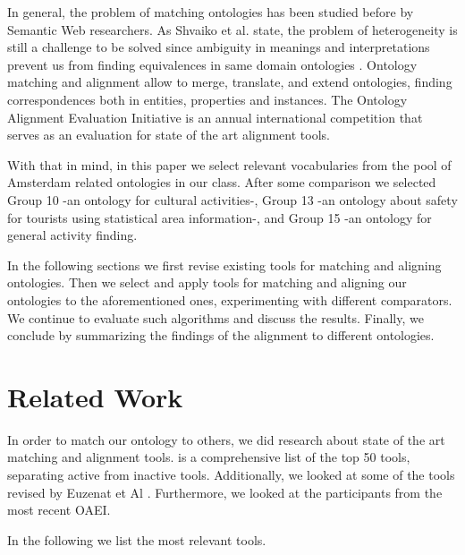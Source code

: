 \documentclass[runningheads,a4paper]{../../StyleFiles/llncs}
\begin{document}
In general, the problem of matching ontologies has been studied before by Semantic Web researchers. As Shvaiko et al. state, the problem of heterogeneity is still a challenge to be solved since ambiguity in meanings and interpretations prevent us from finding equivalences in same domain ontologies \cite{shvaiko2013ontology}. Ontology matching and alignment allow to merge, translate, and extend ontologies, finding correspondences both in entities, properties and instances. The Ontology Alignment Evaluation Initiative is an annual international competition that serves as an evaluation for state of the art alignment tools. 

With that in mind, in this paper we select relevant vocabularies from the pool of Amsterdam related ontologies in our class. After some comparison we selected Group 10 -an ontology for cultural activities-, Group 13 -an ontology about safety for tourists using statistical area information-, and Group 15 -an ontology for general activity finding.

In the following sections we first revise existing tools for matching and aligning ontologies. Then we select and apply tools for matching and aligning our ontologies to the aforementioned ones, experimenting with different comparators. We continue to evaluate such algorithms and discuss the results. Finally, we conclude by summarizing the findings of the alignment to different ontologies.

\section{Related Work}
In order to match our ontology to others, we did research about state of the art matching and alignment tools. \cite{adaptiveInformation_2014} is a comprehensive list of the top 50 tools, separating active from inactive tools. Additionally, we looked at some of the tools revised by Euzenat et Al \cite{euzenat2007ontology}. Furthermore, we looked at the participants from the most recent OAEI.

In the following we list the most relevant tools.
\end{document}
